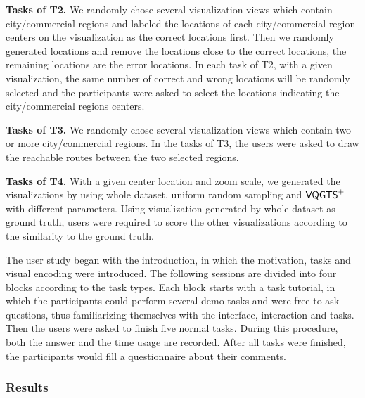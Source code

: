 \textbf{Tasks of T2.} We randomly chose several visualization views which contain city/commercial regions and labeled the locations of each city/commercial region centers on the visualization as the correct locations first.  Then we randomly generated locations and remove the locations close to the correct locations, the remaining locations are the error locations. In each task of T2, with a given visualization, the same number of correct and wrong locations will be randomly selected and the participants were asked to select the locations indicating the city/commercial regions centers. 

\textbf{Tasks of T3.} We randomly chose several visualization views which contain two or more city/commercial regions. In the tasks of T3, the users were asked to draw the reachable routes between the two selected regions. 

\textbf{Tasks of T4.} With a given center location and zoom scale, we generated the visualizations by using whole dataset, uniform random sampling and $\mathsf{VQGTS}^{+}$ with different parameters. Using visualization generated by whole dataset as ground truth, users were required to score the other visualizations according to the similarity to the ground truth.  

The user study began with the introduction, in which the motivation, tasks and visual encoding were introduced. The following sessions are divided into four blocks according to the task types. Each block starts with a task tutorial, in which the participants could perform several demo tasks and were free to ask questions, thus familiarizing themselves with the interface, interaction and tasks.
Then the users were asked to finish five normal tasks. During this procedure, both the answer and the time usage are recorded.
After all tasks were finished, the participants would fill a questionnaire about their comments. 

\subsubsection{Results}



